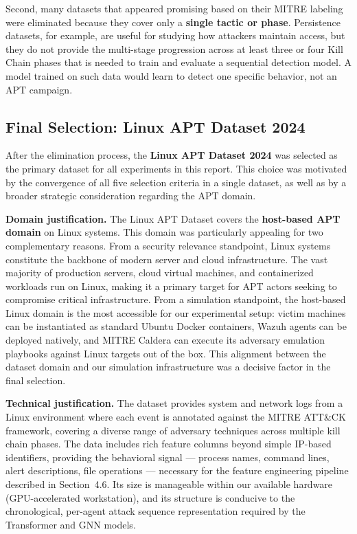 Second, many datasets that appeared promising based on their MITRE labeling were
eliminated because they cover only a \textbf{single tactic or phase}. Persistence
datasets, for example, are useful for studying how attackers maintain access, but
they do not provide the multi-stage progression across at least three or four
Kill Chain phases that is needed to train and evaluate a sequential detection model.
A model trained on such data would learn to detect one specific behavior, not an
APT campaign.

\subsection{Final Selection: Linux APT Dataset 2024}

After the elimination process, the \textbf{Linux APT Dataset 2024}
\cite{karim2024linux} was selected as the primary dataset for all experiments in
this report. This choice was motivated by the convergence of all five selection
criteria in a single dataset, as well as by a broader strategic consideration
regarding the APT domain.

\textbf{Domain justification.} The Linux APT Dataset covers the \textbf{host-based
APT domain} on Linux systems. This domain was particularly appealing for two
complementary reasons. From a security relevance standpoint, Linux systems constitute
the backbone of modern server and cloud infrastructure. The vast majority of production
servers, cloud virtual machines, and containerized workloads run on Linux, making
it a primary target for APT actors seeking to compromise critical infrastructure.
From a simulation standpoint, the host-based Linux domain is the most accessible
for our experimental setup: victim machines can be instantiated as standard Ubuntu
Docker containers, Wazuh agents can be deployed natively, and MITRE Caldera can
execute its adversary emulation playbooks against Linux targets out of the box.
This alignment between the dataset domain and our simulation infrastructure
was a decisive factor in the final selection.

\textbf{Technical justification.} The dataset provides system and network logs
from a Linux environment where each event is annotated against the MITRE ATT\&CK
framework, covering a diverse range of adversary techniques across multiple kill
chain phases. The data includes rich feature columns beyond simple IP-based
identifiers, providing the behavioral signal --- process names, command lines,
alert descriptions, file operations --- necessary for the feature engineering
pipeline described in Section~4.6. Its size is manageable within our available
hardware (GPU-accelerated workstation), and its structure is conducive to the
chronological, per-agent attack sequence representation required by the Transformer
and GNN models.

